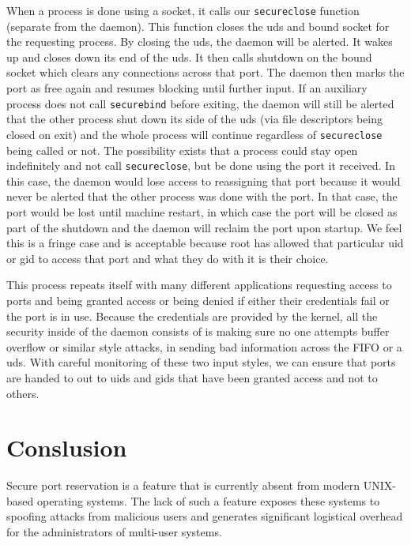 \documentclass{sig-alternate}
\begin{document}
	When a process is done using a socket, it calls our \texttt{secure\textunderscore close} function (separate from the daemon). This function closes the uds and bound socket for the requesting process. By closing the uds, the daemon will be alerted. It wakes up and closes down its end of the uds. It then calls shutdown on the bound socket which clears any connections across that port. The daemon then marks the port as free again and resumes blocking until further input. If an auxiliary process does not call \texttt{secure\textunderscore bind} before exiting, the daemon will still be alerted that the other process shut down its side of the uds (via file descriptors being closed on exit) and the whole process will continue regardless of \texttt{secure\textunderscore close} being called or not. The possibility exists that a process could stay open indefinitely and not call \texttt{secure\textunderscore close}, but be done using the port it received. In this case, the daemon would lose access to reassigning that port because it would never be alerted that the other process was done with the port. In that case, the port would be lost until machine restart, in which case the port will be closed as part of the shutdown and the daemon will reclaim the port upon startup. We feel this is a fringe case and is acceptable because root has allowed that particular uid or gid to access that port and what they do with it is their choice.
	
	This process repeats itself with many different applications requesting access to ports and being granted access or being denied if either their credentials fail or the port is in use. Because the credentials are provided by the kernel, all the security inside of the daemon consists of is making sure no one attempts buffer overflow or similar style attacks, in sending bad information across the FIFO or a uds. With careful monitoring of these two input styles, we can ensure that ports are handed to out to uids and gids that have been granted access and not to others.

\section{Conslusion}
Secure port reservation is a feature that is currently absent from modern UNIX-based operating systems. The lack of such a feature exposes these systems to spoofing attacks from malicious users and generates significant logistical overhead for the administrators of multi-user systems.
\end{document}

